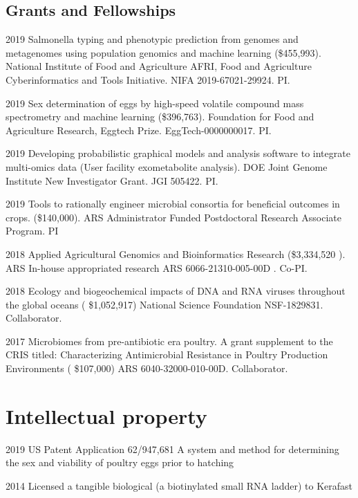 \documentclass[12pt,letterpaper]{report}
\begin{document}
    \subsection*{Grants and Fellowships}

    \begin{tablist}

        \item[2019] \tab  Salmonella typing and phenotypic prediction from genomes and metagenomes using population genomics and machine learning (\$455,993).  National Institute of Food and Agriculture AFRI, Food and Agriculture Cyberinformatics and Tools Initiative. NIFA 2019-67021-29924.  PI.
        
        \item[2019]\tab  Sex determination of eggs by high-speed volatile compound mass spectrometry and machine learning  (\$396,763).  Foundation for Food and Agriculture Research, Eggtech Prize.  EggTech-0000000017. PI.
        
        \item[2019] \tab  Developing probabilistic graphical models and analysis software to integrate multi-omics data (User facility exometabolite analysis). DOE Joint Genome Institute New Investigator Grant. JGI 505422. PI.
        
        \item[2019] \tab Tools to rationally engineer microbial consortia for beneficial outcomes in crops. (\$140,000). ARS Administrator Funded Postdoctoral Research Associate Program. PI
        \item[2018] \tab  Applied Agricultural Genomics and Bioinformatics Research  (\$3,334,520 ). ARS In-house appropriated research ARS 6066-21310-005-00D . Co-PI.
        \item[2018] \tab Ecology and biogeochemical impacts of DNA and RNA viruses throughout the global  oceans ( \$1,052,917)  National Science Foundation NSF-1829831. Collaborator.
        \item[2017] \tab Microbiomes from pre-antibiotic era poultry. A grant supplement to the CRIS titled: Characterizing Antimicrobial Resistance in Poultry Production Environments  ( \$107,000)  ARS 6040-32000-010-00D. Collaborator.

        
              
        
       \end{tablist} 
        
   \section*{Intellectual property}
          \begin{tablist}
           \item[2019]\tab US  Patent Application 62/947,681 A system and method for determining the sex and viability of poultry eggs prior to hatching\\
          \item[2014]\tab  Licensed a tangible biological (a biotinylated small RNA ladder) to Kerafast
          
          \end{tablist} 
\end{document}
